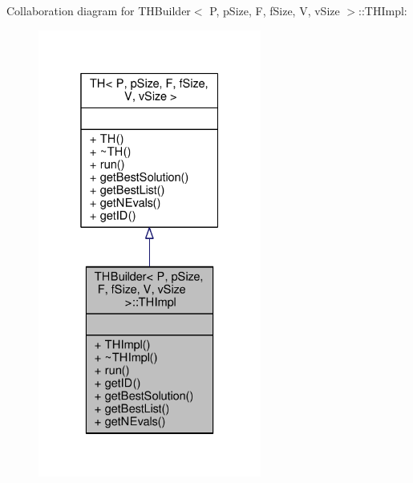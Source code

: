 Collaboration diagram for T\+H\+Builder$<$ P, p\+Size, F, f\+Size, V, v\+Size $>$\+:\+:T\+H\+Impl\+:
\nopagebreak
\begin{figure}[H]
\begin{center}
\leavevmode
\includegraphics[width=208pt]{classTHBuilder_1_1THImpl__coll__graph}
\end{center}
\end{figure}
